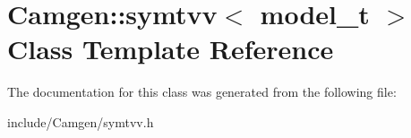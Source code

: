 \hypertarget{a00535}{}\section{Camgen\+:\+:symtvv$<$ model\+\_\+t $>$ Class Template Reference}
\label{a00535}


The documentation for this class was generated from the following file\+:\begin{DoxyCompactItemize}
\item 
include/\+Camgen/symtvv.\+h\end{DoxyCompactItemize}
